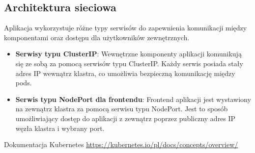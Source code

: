 \documentclass[12pt,a4paper]{article}
\begin{document}
\subsection{Architektura sieciowa}
\label{sec:ExampleResults}
Aplikacja wykorzystuje różne typy serwisów do zapewnienia komunikacji między komponentami oraz dostępu dla użytkowników zewnętrznych.

\begin{itemize}
    \item\textbf{Serwisy typu ClusterIP}: Wewnętrzne komponenty aplikacji komunikują się ze sobą za pomocą serwisów typu ClusterIP. Każdy serwis posiada stały adres IP wewnątrz klastra, co umożliwia bezpieczną komunikację między pods.

    \item\textbf{Serwis typu NodePort dla frontendu}: Frontend aplikacji jest wystawiony na zewnątrz klastra za pomocą serwisu typu NodePort. Jest to sposób umożliwiający dostęp do aplikacji z zewnątrz poprzez publiczny adres IP węzła klastra i wybrany port.
\end{itemize}

\begin{thebibliography}{9}
Dokumentacja Kubernetes
\url{https://kubernetes.io/pl/docs/concepts/overview/}

\end{thebibliography}
\end{document}
